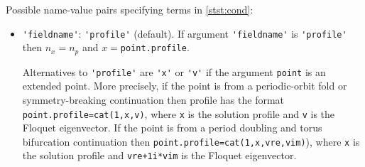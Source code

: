 \documentclass[11pt]{scrartcl}
\newcommand{\blist}[1]{\mbox{\lstinline!#1!}}  \newlength{\tabw}
\begin{document}
Possible name-value pairs specifying terms in \eqref{stst:cond}:
\begin{itemize}
\item \blist{'fieldname'}: \blist{'profile'} (default).  If argument
  \blist{'fieldname'} is \blist{'profile'} then $n_x=n_p$ and
  $x=$\blist{point.profile}.

  Alternatives to \blist{'profile'} are \blist{'x'} or \blist{'v'} if
  the argument \blist{point} is an extended point. More precisely, if
  the point is from a periodic-orbit fold or symmetry-breaking
  continuation then profile has the format
  \blist{point.profile=cat(1,x,v)}, where \blist{x} is the solution
  profile and \blist{v} is the Floquet eigenvector. If the point is
  from a period doubling and torus bifurcation continuation then
  \blist{point.profile=cat(1,x,vre,vim)}), where \blist{x} is the
  solution profile and \blist{vre+1i*vim} is the Floquet eigenvector.
  

\end{itemize}
\end{document}

